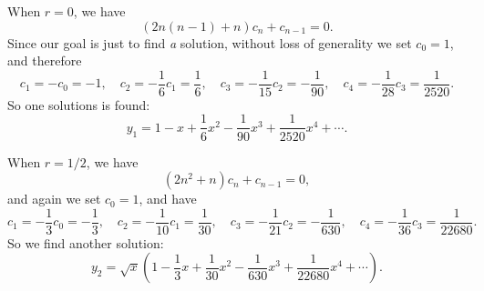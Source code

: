 \documentclass[hyperref, a4paper]{article}
\begin{document}
When $r = 0$, we have 
\[
    (2n(n-1) + n) c_n + c_{n-1} = 0.
\]
Since our goal is just to find \emph{a} solution, 
without loss of generality we set $c_0 = 1$,
and therefore 
\[
    c_1 = - c_0 = - 1, \quad c_2 = - \frac{1}{6} c_1 = \frac{1}{6}, \quad 
    c_3 = - \frac{1}{15} c_2 = - \frac{1}{90}, \quad 
    c_4 = - \frac{1}{28} c_3 = \frac{1}{2520}.
\]
So one solutions is found: 
\begin{equation}
    y_1 = 1 - x + \frac{1}{6} x^2 - \frac{1}{90} x^3 + \frac{1}{2520} x^4 + \cdots.
\end{equation}

When $r = 1/2$, we have 
\[
    (2n^2 + n) c_n + c_{n-1} = 0,
\]
and again we set $c_0 = 1$, and have 
\[
    c_1 = - \frac{1}{3} c_0 = - \frac{1}{3}, \quad 
    c_2 = - \frac{1}{10} c_1 = \frac{1}{30}, \quad 
    c_3 = - \frac{1}{21} c_2 = - \frac{1}{630}, \quad 
    c_4 = - \frac{1}{36} c_3 = \frac{1}{22680}.
\]
So we find another solution: 
\begin{equation}
    y_2 = \sqrt{x} \left(
        1 - \frac{1}{3} x + \frac{1}{30} x^2 - \frac{1}{630} x^3 + \frac{1}{22680} x^4 + \cdots
    \right).
\end{equation}
\end{document}
